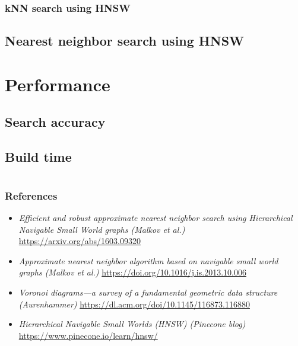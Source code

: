 \documentclass{beamer}
\begin{document}
  \begin{frame}
    \frametitle{kNN search using HNSW}  
   	\begin{enumerate}

	\end{enumerate} 
  \end{frame}
  
\subsection{Nearest neighbor search using HNSW}

  \section{Performance}
\subsection{Search accuracy}




\subsection{Build time}

\section{}
  \begin{frame}
    \frametitle{References}  
    \small
    \begin{itemize}
	\item \textit{Efficient and robust approximate nearest neighbor search using Hierarchical Navigable Small World graphs (Malkov et al.)} \url{https://arxiv.org/abs/1603.09320}    

	\item \textit{Approximate nearest neighbor algorithm based on navigable small world graphs (Malkov et al.)} \url{https://doi.org/10.1016/j.is.2013.10.006}	
	\item \textit{Voronoi diagrams—a survey of a fundamental geometric data structure (Aurenhammer)} \url{https://dl.acm.org/doi/10.1145/116873.116880}
	\item \textit{Hierarchical Navigable Small Worlds (HNSW) (Pinecone blog)} \url{https://www.pinecone.io/learn/hnsw/}
	\end{itemize}
	
  \end{frame}
\end{document}
